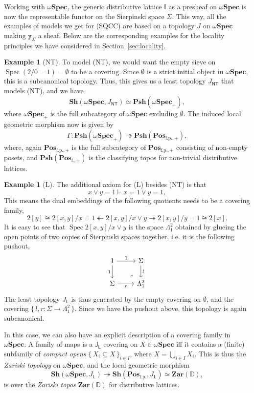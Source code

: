 \documentclass[12pt]{amsart}
\theoremstyle{definition}
\newtheorem{example}[theorem]{Example}
\newcommand{\mb}[1]{\mathbf{#1}}
\newcommand{\mbb}[1]{\mathbb{#1}}
\newcommand{\I}{\mbb I}
\newcommand{\mr}[1]{\mathrm{#1}}
\newcommand{\ms}[1]{\mathsf{#1}}
\newcommand{\Pos}{\mb{Pos}}
\newcommand{\sh}{\mb{Sh}}
\newcommand{\psh}{\mb{Psh}}
\newcommand{\set}[1]{\{\,#1\,\}}
\newcommand{\yon}{\mathtt{y}}
\newcommand{\surj}{\twoheadrightarrow}
\newcommand{\fp}{_{\mr{f.p.}}}
\newcommand{\emp}{\emptyset}
\newcommand{\wSpec}{\omega\mb{Spec}}
\newcommand{\spec}{\operatorname{Spec}}
\DeclareRobustCommand{\yon}{\text{\usefont{U}{dmjhira}{m}{n}\symbol{"48}}}
\begin{document}
Working with $\wSpec$, the generic distributive lattice $\I$ as a presheaf on $\wSpec$ is now the representable functor on the Sierpinski space $\Sigma$. This way, all the examples of models we get for (SQCC) are based on a topology $J$ on $\wSpec$ making $\yon_\Sigma$ a sheaf. Below are the corresponding examples for the locality principles we have considered in Section~\ref{sec:locality}.

\begin{example}[NT]
  To model (NT), we would want the empty sieve on $\spec(2/0=1) = \emp$ to be a covering. Since $\emp$ is a strict initial object in $\wSpec$, this is a subcanonical topology. Thus, this gives us a least topology $J_{\ms{NT}}$ that models (NT), and we have
  \[ \sh(\wSpec,J_{\ms{NT}}) \simeq \psh(\wSpec_+), \]
  where $\wSpec_+$ is the full subcategory of $\wSpec$ excluding $\emp$. The induced local geometric morphism now is given by 
  \[ \Gamma : \psh(\wSpec_+) \surj \psh(\Pos_{\mr{f.p.,+}}), \]
  where, again $\Pos_{\mr{f.p.,+}}$ is the full subcategory of $\Pos_{\mr{f.p.,+}}$ consisting of non-empty posets, and $\psh(\Pos_{\mr{f.,+}})$ is the classifying topos for non-trivial distributive lattices.
\end{example}

\begin{example}[L]
  The additional axiom for (L) besides (NT) is that 
  \[ x \vee y = 1 \vdash x = 1 \vee y = 1, \] 
  This means the dual embeddings of the following quotients needs to be a covering family,
  \[ 2[y] \cong 2[x,y]/x = 1 \twoheadleftarrow 2[x,y]/x\vee y \surj 2[x,y]/y=1 \cong 2[x]. \]
  It is easy to see that $\spec 2[x,y]/x \vee y$ is the space $\Lambda^2_1$ obtained by glueing the open points of two copies of Sierpinski spaces together, i.e. it is the following pushout,
  \[
  \begin{tikzcd}
    1 \ar[d, "1"'] \ar[r, "1"] & \Sigma \ar[d, "l"] \\ 
    \Sigma \ar[r, "r"'] & \Lambda^2_1
    \arrow["\lrcorner"{anchor=center, pos=0.125, rotate=180}, draw=none, from=2-2, to=1-1]    
  \end{tikzcd}
  \]
  The least topology $J_{\ms L}$ is thus generated by the empty covering on $\emp$, and the covering $\set{l,r : \Sigma \to \Lambda^2_1}$. Since we have the pushout above, this topology is again subcanonical. 
  
  In this case, we can also have an explicit description of a covering family in $\wSpec$: A family of maps is a $\ms J_{\ms L}$ covering on $X \in \wSpec$ iff it contains a (finite) subfamily of \emph{compact opens} $\set{X_i\subseteq X}_{i\in I}$, where $X = \bigcup_{i\in I}X_i$. This is thus the \emph{Zariski topology} on $\wSpec$, and the local geometric morphism
  \[ \sh(\wSpec,J_{\ms L}) \surj \sh(\Pos\fp,J_{\ms L}) \simeq \mb{Zar}(\mbb D), \]
  is over the \emph{Zariski topos} $\mb{Zar}(\mbb D)$ for distributive lattices.
\end{example}
\end{document}
